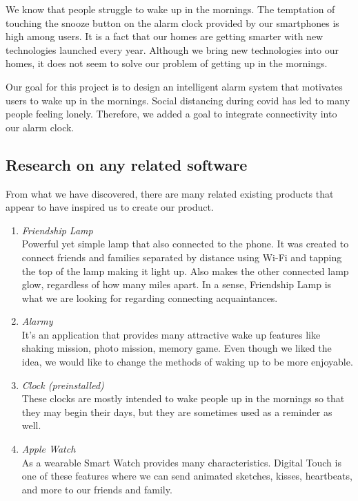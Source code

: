 \documentclass[conference]{IEEEtran}
\begin{document}
We know that people struggle to wake up in the mornings. The temptation of touching the snooze button on the alarm clock provided by our smartphones is high among users. It is a fact that our homes are getting smarter with new technologies launched every year. Although we bring new technologies into our homes, it does not seem to solve our problem of getting up in the mornings. 

Our goal for this project is to design an intelligent alarm system that motivates users to wake up in the mornings. Social distancing during covid has led to many people feeling lonely. Therefore, we added a goal to integrate connectivity into our alarm clock. 
\subsection{Research on any related software}
From what we have discovered, there are many related existing products that appear to have inspired us to create our product.
\begin{enumerate}
\item \textit{Friendship Lamp}\\ 
Powerful yet simple lamp that also connected to the phone. It was created to connect friends and families separated by distance using Wi-Fi and tapping the top of the lamp making it light up. Also makes the other connected lamp glow, regardless of how many miles apart. In a sense, Friendship Lamp is what we are looking for regarding connecting acquaintances.\\
\item \textit{Alarmy} \\
It’s an application that provides many attractive wake up features like shaking mission, photo mission, memory game. Even though we liked the idea, we would like to change the methods of waking up to be more enjoyable.\\
\item \textit{Clock (preinstalled)}\\
These clocks are mostly intended to wake people up in the mornings so that they may begin their days,  but they are sometimes used as a reminder as well.\\
\item \textit{Apple Watch}\\
As a wearable Smart Watch provides many characteristics. Digital Touch is one of these features where we can send animated sketches,  kisses, heartbeats, and more to our friends and family.\\

\end{enumerate}
\end{document}
